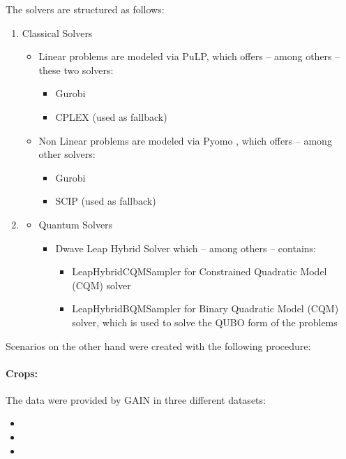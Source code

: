 \documentclass{oqireport}
\begin{document}
The solvers are structured as follows:
\begin{enumerate}
    \item Classical Solvers\begin{itemize}
        \item Linear problems are modeled via PuLP, which offers -- among others -- these two solvers:
        \begin{itemize}
            \item Gurobi \cite{gurobi2023}
            \item CPLEX \cite{cplex2023} (used as fallback)
        \end{itemize}
        \item Non Linear problems are modeled via Pyomo \cite{bynum2021pyomo}, which offers -- among other solvers:
        \begin{itemize}
            \item Gurobi \cite{gurobi2023}
            \item SCIP \cite{BolusaniEtal2024OO} (used as fallback)
        \end{itemize}
    \end{itemize}
    \item \begin{itemize}
        \item Quantum Solvers
        \begin{itemize}
            \item Dwave Leap Hybrid Solver \cite{DwaveLeapHybrid} which -- among others -- contains:
            \begin{itemize}
                \item LeapHybridCQMSampler for Constrained Quadratic Model (CQM) solver
                \item LeapHybridBQMSampler for Binary Quadratic Model (CQM) solver, which is used to solve the QUBO form of the problems
            \end{itemize}
        \end{itemize}
    \end{itemize}
\end{enumerate}

Scenarios on the other hand were created with the following procedure:

\paragraph{Crops:}

The data were provided by GAIN \cite{GAIN} in three different datasets:
\begin{itemize}
    \item {}
    \item {}
    \item {}
\end{itemize}
\end{document}
